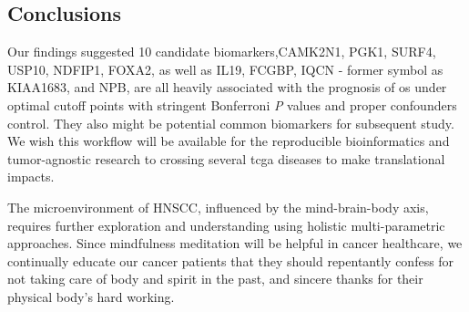 \documentclass[jpm,article,submit,moreauthors,pdftex]{Definitions/mdpi}
\begin{document}
\begin{paracol}{2}
\section{Conclusions} %
Our findings suggested 10 candidate biomarkers,CAMK2N1, PGK1, SURF4, USP10, NDFIP1, FOXA2, as well as IL19, FCGBP, IQCN - former symbol as KIAA1683, and NPB, are all heavily associated with the prognosis of \acrshort{os} under optimal cutoff points with stringent Bonferroni \textit{P} values and proper confounders control. They also might be potential common biomarkers for subsequent study.
We wish this workflow will be available for the reproducible bioinformatics\cite{Preeyanon2014}\cite{Kulkarni2018} and tumor-agnostic research\cite{Looney2020} to crossing several \acrshort{tcga} diseases to make translational impacts. %

The microenvironment of HNSCC, influenced by the mind-brain-body axis, requires further exploration and understanding using holistic multi-parametric approaches.
Since mindfulness meditation will be helpful in cancer healthcare, we continually educate our cancer patients that they should repentantly confess for not taking care of body and spirit in the past, and sincere thanks for their physical body's hard working.




\end{paracol}
\end{document}
